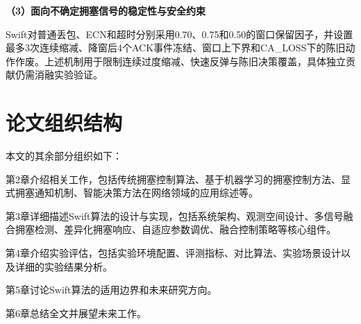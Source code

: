 \textbf{（3）面向不确定拥塞信号的稳定性与安全约束}

Swift对普通丢包、ECN和超时分别采用0.70、0.75和0.50的窗口保留因子，并设置最多3次连续缩减、降窗后4个ACK事件冻结、窗口上下界和CA\_LOSS下的陈旧动作作废。上述机制用于限制连续过度缩减、快速反弹与陈旧决策覆盖，具体独立贡献仍需消融实验验证。

\section{论文组织结构}

本文的其余部分组织如下：

第2章介绍相关工作，包括传统拥塞控制算法、基于机器学习的拥塞控制方法、显式拥塞通知机制、智能决策方法在网络领域的应用综述等。

第3章详细描述Swift算法的设计与实现，包括系统架构、观测空间设计、多信号融合拥塞检测、差异化拥塞响应、自适应参数调优、融合控制策略等核心组件。

第4章介绍实验评估，包括实验环境配置、评测指标、对比算法、实验场景设计以及详细的实验结果分析。

第5章讨论Swift算法的适用边界和未来研究方向。

第6章总结全文并展望未来工作。
